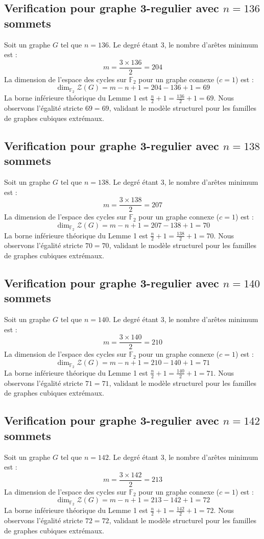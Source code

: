\documentclass[11pt,a4paper]{article}
\begin{document}
\subsection{Verification pour graphe 3-regulier avec $n=136$ sommets}
Soit un graphe $G$ tel que $n = 136$. Le degré étant 3, le nombre d'arêtes minimum est :
$$ m = \frac{3 \times 136}{2} = 204 $$
La dimension de l'espace des cycles sur $\mathbb{F}_2$ pour un graphe connexe ($c=1$) est :
$$ \dim_{\mathbb{F}_2} \mathcal{Z}(G) = m - n + 1 = 204 - 136 + 1 = 69 $$
La borne inférieure théorique du Lemme 1 est $\frac{n}{2} + 1 = \frac{136}{2} + 1 = 69$.
Nous observons l'égalité stricte $69 = 69$, validant le modèle structurel pour les familles de graphes cubiques extrémaux.

\subsection{Verification pour graphe 3-regulier avec $n=138$ sommets}
Soit un graphe $G$ tel que $n = 138$. Le degré étant 3, le nombre d'arêtes minimum est :
$$ m = \frac{3 \times 138}{2} = 207 $$
La dimension de l'espace des cycles sur $\mathbb{F}_2$ pour un graphe connexe ($c=1$) est :
$$ \dim_{\mathbb{F}_2} \mathcal{Z}(G) = m - n + 1 = 207 - 138 + 1 = 70 $$
La borne inférieure théorique du Lemme 1 est $\frac{n}{2} + 1 = \frac{138}{2} + 1 = 70$.
Nous observons l'égalité stricte $70 = 70$, validant le modèle structurel pour les familles de graphes cubiques extrémaux.

\subsection{Verification pour graphe 3-regulier avec $n=140$ sommets}
Soit un graphe $G$ tel que $n = 140$. Le degré étant 3, le nombre d'arêtes minimum est :
$$ m = \frac{3 \times 140}{2} = 210 $$
La dimension de l'espace des cycles sur $\mathbb{F}_2$ pour un graphe connexe ($c=1$) est :
$$ \dim_{\mathbb{F}_2} \mathcal{Z}(G) = m - n + 1 = 210 - 140 + 1 = 71 $$
La borne inférieure théorique du Lemme 1 est $\frac{n}{2} + 1 = \frac{140}{2} + 1 = 71$.
Nous observons l'égalité stricte $71 = 71$, validant le modèle structurel pour les familles de graphes cubiques extrémaux.

\subsection{Verification pour graphe 3-regulier avec $n=142$ sommets}
Soit un graphe $G$ tel que $n = 142$. Le degré étant 3, le nombre d'arêtes minimum est :
$$ m = \frac{3 \times 142}{2} = 213 $$
La dimension de l'espace des cycles sur $\mathbb{F}_2$ pour un graphe connexe ($c=1$) est :
$$ \dim_{\mathbb{F}_2} \mathcal{Z}(G) = m - n + 1 = 213 - 142 + 1 = 72 $$
La borne inférieure théorique du Lemme 1 est $\frac{n}{2} + 1 = \frac{142}{2} + 1 = 72$.
Nous observons l'égalité stricte $72 = 72$, validant le modèle structurel pour les familles de graphes cubiques extrémaux.
\end{document}
